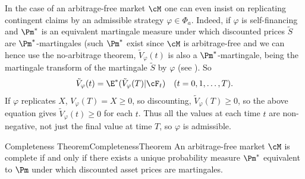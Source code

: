 In the case of an arbitrage-free market $\cM$ one can even insist on replicating contingent claims by an admissible strategy $\varphi \in \Phi_a$. Indeed, if $\varphi$ is self-financing and $\Pm^*$ is an equivalent martingale measure under which discounted prices $\tilde{S}$ are $\Pm^*$-martingales (such $\Pm^*$ exist since $\cM$ is arbitrage-free and we can hence use the no-arbitrage theorem,  $\tilde{V}_\varphi(t)$ is also a $\Pm^*$-martingale, being the martingale transform of the martingale $\tilde{S}$ by $\varphi$ (see ). So
\begin{equation}
	\tilde{V}_\varphi(t) = \E^ *(\tilde{V}_\varphi(T)|\cF_t) \quad (t=0,1,\dots,T).
\end{equation}
If $\varphi$ replicates $X$, $V_\varphi(T) = X \ge 0$, so discounting, $\tilde{V}_\varphi(T) \ge 0$, so the above equation gives $\tilde{V}_\varphi(t) \ge 0$ for each $t$. Thus all the values at each time $t$ are non-negative, not just the final value at time $T$, so $\varphi$ is admissible.

\begin{thm}{Completeness Theorem}{CompletenessTheorem}
	An arbitrage-free market $\cM$ is complete if and only if there exists a unique probability measure $\Pm^*$ equivalent to $\Pm$ under which discounted asset prices are martingales.
\end{thm}

